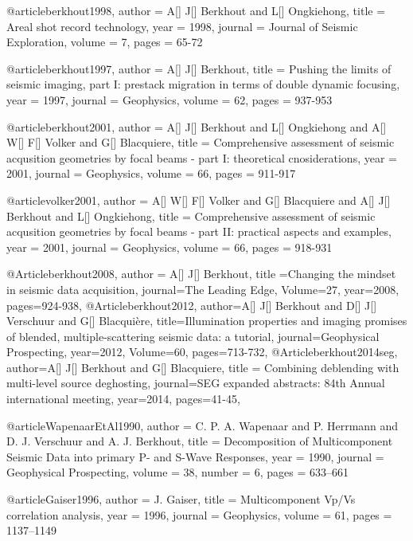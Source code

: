 @article{berkhout1998,
  author =	 {A[] J[] Berkhout and L[] Ongkiehong},
  title =	 {Areal shot record technology},
  year =	 1998,
  journal =	 {Journal of Seismic Exploration},
  volume =	 7,
  pages =	 {65-72}
}

@article{berkhout1997,
  author =	 {A[] J[] Berkhout},
  title =	 {Pushing the limits of seismic imaging, part I: prestack migration in terms of double dynamic focusing},
  year =	 1997,
  journal =	 {Geophysics},
  volume =	 62,
  pages =	 {937-953}
}

@article{berkhout2001,
  author =	 {A[] J[] Berkhout and L[] Ongkiehong and A[] W[] F[] Volker and G[] Blacquiere},
  title =	 {Comprehensive assessment of seismic acqusition geometries by focal beams - part {I}: theoretical cnosiderations},
  year =	 2001,
  journal =	 {Geophysics},
  volume =	 66,
  pages =	 {911-917}
}

@article{volker2001,
  author =	 {A[] W[] F[] Volker and G[] Blacquiere and A[] J[] Berkhout and L[] Ongkiehong},
  title =	 {Comprehensive assessment of seismic acqusition geometries by focal beams - part {II}: practical aspects and examples},
  year =	 2001,
  journal =	 {Geophysics},
  volume =	 66,
  pages =	 {918-931}
}

@Article{berkhout2008,
  author = {A[] J[] Berkhout},
  title ={Changing the mindset in seismic data acquisition},
  journal={The Leading Edge},
  Volume=27,
  year=2008,
  pages={924-938},
}
@Article{berkhout2012,
  author={A[] J[] Berkhout and D[] J[] Verschuur and G[] Blacqui\`{e}re},
  title={Illumination properties and imaging promises of blended, multiple-scattering seismic data: a tutorial},
  journal={Geophysical Prospecting},
  year=2012,
  Volume=60,
  pages={713-732},
}
@Article{berkhout2014seg,
  author={A[] J[] Berkhout and G[] Blacquiere},
  title = {Combining deblending with multi-level source deghosting},
  journal={SEG expanded abstracts: 84th Annual international meeting},
  year=2014,
  pages={41-45},
}

@article{WapenaarEtAl1990,
  author =	 {C. P. A. Wapenaar and P. Herrmann and
                  D. J. Verschuur and A. J. Berkhout},
  title =	 {Decomposition of Multicomponent Seismic Data into
                  primary {P}- and {S}-Wave Responses},
  year =	 1990,
  journal =	 {Geophysical Prospecting},
  volume =	 38,
  number =	 6,
  pages =	 {633--661}
}



@article{Gaiser1996,
  author =	 {J. Gaiser},
  title =	 {Multicomponent {V}p/{V}s correlation analysis},
  year =	 1996,
  journal =	 {Geophysics},
  volume =	 61,
  pages =	 {1137--1149}
}

